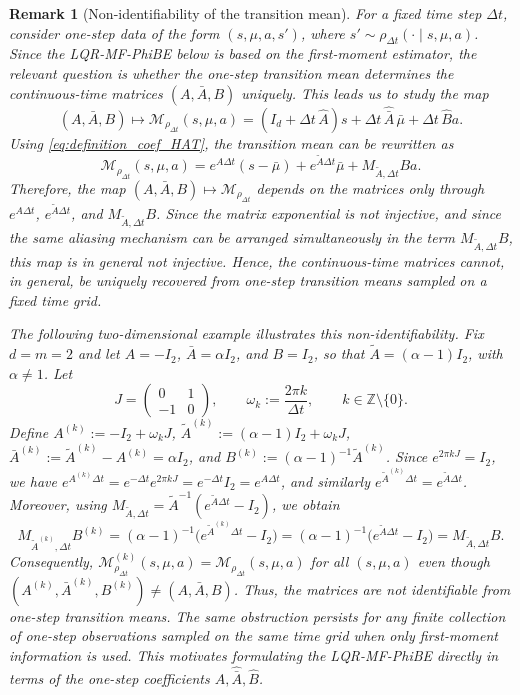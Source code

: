 \documentclass[a4paper, 10pt, english, reqno]{amsart}
\newtheorem{remark}[theorem]{Remark}
\begin{document}
\begin{remark}[Non-identifiability of the transition mean]
\label{rem:nonidentifiability_mkv}
For a fixed time step $\Delta t$, consider one-step data of the form $(s,\mu,a,s')$, where $s'\sim \rho_{\Delta t}(\cdot\mid s,\mu,a)$. Since the LQR-MF-PhiBE below is based on the first-moment estimator, the relevant question is whether the one-step transition mean determines the continuous-time matrices $(A,\bar A,B)$ uniquely. This leads us to study the map
\[
    (A,\bar A,B)\longmapsto \mathcal M_{\rho_{\Delta t}}(s,\mu,a)
    =
    (I_d+\Delta t\,\hat A)s
    +
    \Delta t\,\hat{\bar A}\,\bar\mu
    +
    \Delta t\,\hat B a.
\]
Using \eqref{eq:definition_coef_HAT}, the transition mean can be rewritten as
\[
    \mathcal M_{\rho_{\Delta t}}(s,\mu,a)
    =
    e^{A\Delta t}(s-\bar\mu)
    +
    e^{\tilde A\Delta t}\bar\mu
    +
    M_{\tilde A,\Delta t}Ba.
\]
Therefore, the map $(A,\bar A,B)\mapsto \mathcal M_{\rho_{\Delta t}}$ depends on the matrices only through $e^{A\Delta t}$, $e^{\tilde A\Delta t}$, and $M_{\tilde A,\Delta t}B$. Since the matrix exponential is not injective, and since the same aliasing mechanism can be arranged simultaneously in the term $M_{\tilde A,\Delta t}B$, this map is in general not injective. Hence, the continuous-time matrices cannot, in general, be uniquely recovered from one-step transition means sampled on a fixed time grid.

The following two-dimensional example illustrates this non-identifiability. Fix $d=m=2$ and let $A=-I_2$, $\bar A=\alpha I_2$, and $B=I_2$, so that $\tilde A=(\alpha-1)I_2$, with $\alpha\neq1$. Let
\[
    J=
    \begin{pmatrix}
        0 & 1\\
        -1 & 0
    \end{pmatrix},
    \qquad
    \omega_k:=\frac{2\pi k}{\Delta t},
    \qquad
    k\in\mathbb Z\setminus\{0\}.
\]
Define $A^{(k)}:=-I_2+\omega_kJ$, $\tilde A^{(k)}:=(\alpha-1)I_2+\omega_kJ$, $\bar A^{(k)}:=\tilde A^{(k)}-A^{(k)}=\alpha I_2$, and $B^{(k)}:=(\alpha-1)^{-1}\tilde A^{(k)}$. Since $e^{2\pi kJ}=I_2$, we have $e^{A^{(k)}\Delta t}=e^{-\Delta t}e^{2\pi kJ}=e^{-\Delta t}I_2=e^{A\Delta t}$, and similarly $e^{\tilde A^{(k)}\Delta t}=e^{\tilde A\Delta t}$. Moreover, using $M_{\tilde A,\Delta t}=\tilde A^{-1}(e^{\tilde A\Delta t}-I_2)$, we obtain
\[
    M_{\tilde A^{(k)},\Delta t}B^{(k)}
    =
    (\alpha-1)^{-1}
    \bigl(e^{\tilde A^{(k)}\Delta t}-I_2\bigr)
    =
    (\alpha-1)^{-1}
    \bigl(e^{\tilde A\Delta t}-I_2\bigr)
    =
    M_{\tilde A,\Delta t}B.
\]
Consequently, $\mathcal M_{\rho_{\Delta t}}^{(k)}(s,\mu,a)
    =
    \mathcal M_{\rho_{\Delta t}}(s,\mu,a)$ for all $(s,\mu,a)$ even though $(A^{(k)},\bar A^{(k)},B^{(k)})\neq(A,\bar A,B)$. Thus, the matrices are not identifiable from one-step transition means. The same obstruction persists for any finite collection of one-step observations sampled on the same time grid when only first-moment information is used. This motivates formulating the LQR-MF-PhiBE directly in terms of the one-step coefficients $\hat A,\hat{\bar A},\hat B$.
\end{remark}
\end{document}

